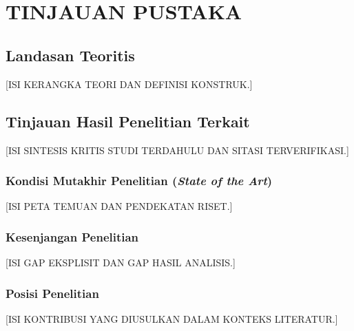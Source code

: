 \chapter[TINJAUAN PUSTAKA]{\\ TINJAUAN PUSTAKA}
\section{Landasan Teoritis}
[ISI KERANGKA TEORI DAN DEFINISI KONSTRUK.]

\section{Tinjauan Hasil Penelitian Terkait}
[ISI SINTESIS KRITIS STUDI TERDAHULU DAN SITASI TERVERIFIKASI.]

\subsection{Kondisi Mutakhir Penelitian (\textit{State of the Art})}
[ISI PETA TEMUAN DAN PENDEKATAN RISET.]

\subsection{Kesenjangan Penelitian}
[ISI GAP EKSPLISIT DAN GAP HASIL ANALISIS.]

\subsection{Posisi Penelitian}
[ISI KONTRIBUSI YANG DIUSULKAN DALAM KONTEKS LITERATUR.]
